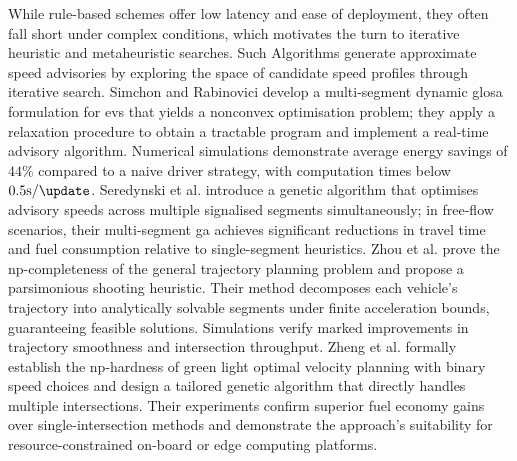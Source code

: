 \mynewline
While rule-based schemes offer low latency and ease of deployment, they often fall short under complex conditions, which motivates the turn to iterative heuristic and metaheuristic searches. Such Algorithms generate approximate speed advisories by exploring the space of candidate speed profiles through iterative search. Simchon and Rabinovici \cite{RealTimeGLOSA2020} develop a multi-segment dynamic \ac{glosa} formulation for \acp{ev} that yields a nonconvex optimisation problem; they apply a relaxation procedure to obtain a tractable program and implement a real-time advisory algorithm. Numerical simulations demonstrate average energy savings of $44\%$ compared to a naive driver strategy, with computation times below $0.5\unit{\second\per\update}$. Seredynski et al. \cite{Seredynski2013} introduce a genetic algorithm that optimises advisory speeds across multiple signalised segments simultaneously; in free-flow scenarios, their multi-segment \ac{ga} achieves significant reductions in travel time and fuel consumption relative to single-segment heuristics. Zhou et al. \cite{Zhou2015} prove the \ac{np}-completeness of the general trajectory planning problem and propose a parsimonious shooting heuristic. Their method decomposes each vehicle’s trajectory into analytically solvable segments under finite acceleration bounds, guaranteeing feasible solutions. Simulations verify marked improvements in trajectory smoothness and intersection throughput. Zheng et al. \cite{Zheng2015} formally establish the \ac{np}-hardness of green light optimal velocity planning with binary speed choices and design a tailored genetic algorithm that directly handles multiple intersections. Their experiments confirm superior fuel economy gains over single-intersection methods and demonstrate the approach’s suitability for resource-constrained on-board or edge computing platforms. 
\mynewline
